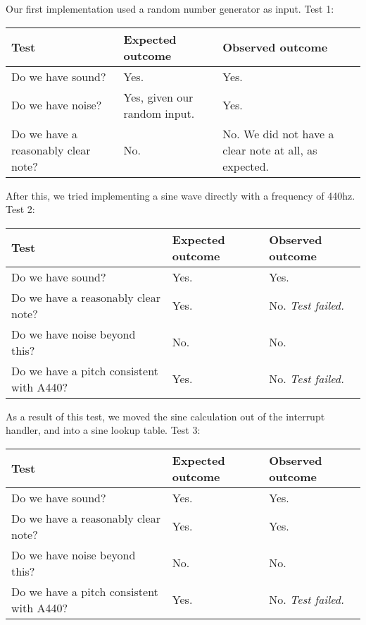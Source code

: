 Our first implementation used a random number generator as input.
Test 1:
\begin{center}
\begin{tabular}{|p{3.6cm}|p{3.6cm}|p{3.6cm}|}
\hline
{\sc Test} & {\sc Expected outcome} & {\sc Observed outcome}\\ \hline
Do we have sound? & Yes. & Yes.\\ \hline
Do we have noise? & Yes, given our random input. & Yes. \\ \hline
Do we have a reasonably clear note? & No. & No. We did not have a clear note at all, as expected.\\ \hline
\end{tabular}
\end{center}
After this, we tried implementing a sine wave directly with a frequency
of 440hz.
Test 2:
\begin{center}
\begin{tabular}{|p{3.6cm}|p{3.6cm}|p{3.6cm}|}
\hline
{\sc Test} & {\sc Expected outcome} & {\sc Observed outcome}\\ \hline
Do we have sound? & Yes. & Yes. \\ \hline
Do we have a reasonably clear note? & Yes. & No. {\em Test failed.} \\ \hline
Do we have noise beyond this? & No. & No. \\ \hline
Do we have a pitch consistent with A440? & Yes. & No. {\em Test failed.} \\
\hline
\end{tabular}
\end{center}

As a result of this test, we moved the sine calculation out of the
interrupt handler, and into a sine lookup table.
Test 3:
\begin{center}
\begin{tabular}{|p{3.6cm}|p{3.6cm}|p{3.6cm}|}
\hline
{\sc Test} & {\sc Expected outcome} & {\sc Observed outcome}\\ \hline
Do we have sound? & Yes. & Yes. \\ \hline
Do we have a reasonably clear note? & Yes. & Yes. \\ \hline
Do we have noise beyond this? & No. & No. \\ \hline
Do we have a pitch consistent with A440? & Yes. & No. {\em Test failed.} \\
\hline
\end{tabular}
\end{center}

